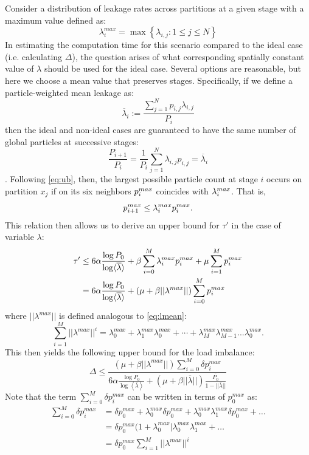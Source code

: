Consider a distribution of leakage rates across partitions at a given stage with
a maximum value defined as:
\begin{equation}
  \lambda^{max}_i = \max \left\{\lambda_{i,j} : 1 \le j \le N\right\}
\end{equation}
In estimating the computation time for this scenario compared to the ideal case
(i.e. calculating $\Delta$), the question arises of what corresponding spatially
constant value of $\lambda$ should be used for the ideal case. Several options
are reasonable, but here we choose a mean value that preserves
stages. Specifically, if we define a particle-weighted mean leakage as:
\begin{equation}
\label{eq:pmean}
\overline{\lambda}_i := \frac{\sum_{j=1}^{N} p_{i,j} \lambda_{i,j}}{P_i}
\end{equation}
then the ideal and non-ideal cases are guaranteed to have the same number of
global particles at successive stages: \[ \frac{P_{i+1}}{P_i} =
\frac{1}{P_i}\sum_{j=1}^N \lambda_{i,j} p_{i,j} = \overline{\lambda}_i \].
Following \eqref{eq:ub}, then, the largest possible particle count at stage $i$
occurs on partition $x_j$ if on its six neighbors ${p_i^{max}}$ coincides with
${\lambda_i^{max}}$.  That is,
\begin{equation}
  \label{eq:ub2}
  p^{max}_{i+1} \le {\lambda_i^{max}} {p_i^{max}}.
\end{equation}
This relation then allows us to derive an upper bound for $\tau'$ in the case of
variable $\lambda$:
\begin{align*}
  \tau' &\le 6\alpha\frac{\log P_0}{\log \langle \overline{\lambda} \rangle} + \beta \sum_{i=0}^{M} {\lambda_i^{max}}
  {p_i^{max}} + \mu \sum_{i=1}^M {p_i^{max}}  \\
  &= 6\alpha\frac{\log P_0}{\log \langle \overline{\lambda} \rangle} + (\mu + \beta ||\lambda^{max}||)
  \sum_{i=0}^{M} {p_i^{max}}
\end{align*}
where $||\lambda^{max}||$ is defined analogous to \eqref{eq:lmean}:
\begin{equation*}
  \sum_{i=1}^M ||\lambda^{max}||^i = \lambda^{max}_0 +
  \lambda^{max}_1\lambda^{max}_0 + \cdots +
  \lambda^{max}_M\lambda^{max}_{M-1}...\lambda^{max}_0.
\end{equation*}
This then yields the following upper bound for the load imbalance:
\begin{equation}
  \label{eq:delta4}
  \Delta \le \frac{ (\mu + \beta ||\lambda^{max}||)\sum_{i=0}^M \delta
    p_i^{max}} {6\alpha\frac{\log P_0}{\log \left<\overline{\lambda}\right>} +
    (\mu + \beta
    ||\overline{\lambda}||)\frac{\overline{P_0}}{1-||\overline{\lambda}||}}
\end{equation}
Note that the term $\sum_{i=0}^M \delta p_i^{max}$ can be written in terms of
$p_0^{max}$ as:
\begin{align*}
  \sum_{i=0}^M \delta p_i^{max} &= \delta p_0^{max} + \lambda_0^{max} \delta
  p_0^{max} + \lambda_0^{max} \lambda_1^{max}\delta p_0^{max} + \dots \\
  &= \delta p_0^{max}(1 + \lambda_0^{max} | \lambda_0^{max}\lambda_1^{max} +
  \dots \\
  &= \delta p_0^{max}\sum_{i=1}^M ||\lambda^{max}||^i
\end{align*}

